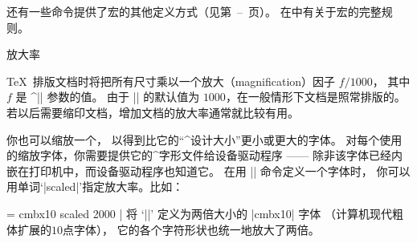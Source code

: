 {{{{{{%
还有一些命令提供了宏的其他定义方式（见第~--~页）。
在中有关于宏的完整规则。
}%
\endconcept


\concept 放大率

\TeX\ 排版文档时将把所有尺寸乘以一个放大（magnification）因子 $f/1000$，
其中 $f$ 是 ^|\mag| 参数\ctsref\mag 的值。
由于 |\mag| 的默认值为 $1000$，在一般情形下文档是照常排版的。
若以后需要缩印文档，增加文档的放大率通常就比较有用。

你也可以缩放一个，
以得到比它的“^{设计大小}”更小或更大的字体。
对每个使用的缩放字体，你需要提供它的^{字形文件}给设备驱动程序%
——
除非该字体已经内嵌在打印机中，而设备驱动程序也知道它。
在用 |\font| 命令\ctsref{\font}定义一个字体时，
你可以用单词‘|scaled|’指定放大率。比如：

\csdisplay
\font\largerbold = cmbx10 scaled 2000
|
将 `|\largerbold|' 定义为两倍大小的 |cmbx10| 字体%
（计算机现代粗体扩展的$10$点字体），
它的各个字符形状也统一地放大了两倍。

}}}}}
